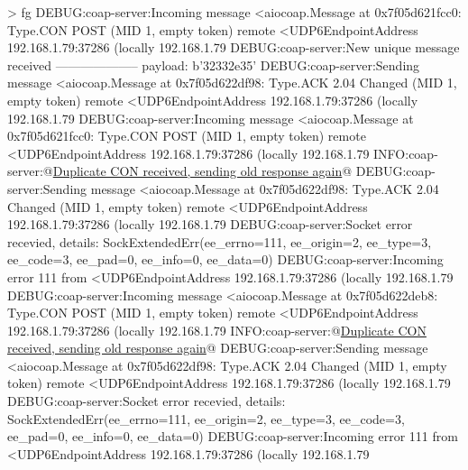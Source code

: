 \begin{termc}[backgroundcolor=\color{palerod}, basicstyle=\ttfamily\tiny, escapechar=@] 
> fg
DEBUG:coap-server:Incoming message <aiocoap.Message at 0x7f05d621fcc0: Type.CON POST (MID 1, empty token) remote 
<UDP6EndpointAddress 192.168.1.79:37286 (locally 192.168.1.79%
DEBUG:coap-server:New unique message received
--------------------
payload: b'32332e35'
DEBUG:coap-server:Sending message <aiocoap.Message at 0x7f05d622df98: Type.ACK 2.04 Changed (MID 1, empty token) 
remote <UDP6EndpointAddress 192.168.1.79:37286 (locally 192.168.1.79%
DEBUG:coap-server:Incoming message <aiocoap.Message at 0x7f05d621fcc0: Type.CON POST (MID 1, empty token) remote 
<UDP6EndpointAddress 192.168.1.79:37286 (locally 192.168.1.79%
INFO:coap-server:@\ul{Duplicate CON received, sending old response again}@
DEBUG:coap-server:Sending message <aiocoap.Message at 0x7f05d622df98: Type.ACK 2.04 Changed (MID 1, empty token) 
remote <UDP6EndpointAddress 192.168.1.79:37286 (locally 192.168.1.79%
DEBUG:coap-server:Socket error recevied, details: SockExtendedErr(ee_errno=111, ee_origin=2, ee_type=3, ee_code=3, 
ee_pad=0, ee_info=0, ee_data=0)
DEBUG:coap-server:Incoming error 111 from <UDP6EndpointAddress 192.168.1.79:37286 (locally 192.168.1.79%
DEBUG:coap-server:Incoming message <aiocoap.Message at 0x7f05d622deb8: Type.CON POST (MID 1, empty token) remote 
<UDP6EndpointAddress 192.168.1.79:37286 (locally 192.168.1.79%
INFO:coap-server:@\ul{Duplicate CON received, sending old response again}@
DEBUG:coap-server:Sending message <aiocoap.Message at 0x7f05d622df98: Type.ACK 2.04 Changed (MID 1, empty token) 
remote <UDP6EndpointAddress 192.168.1.79:37286 (locally 192.168.1.79%
DEBUG:coap-server:Socket error recevied, details: SockExtendedErr(ee_errno=111, ee_origin=2, ee_type=3, ee_code=3, 
ee_pad=0, ee_info=0, ee_data=0)
DEBUG:coap-server:Incoming error 111 from <UDP6EndpointAddress 192.168.1.79:37286 (locally 192.168.1.79%
\end{termc}




